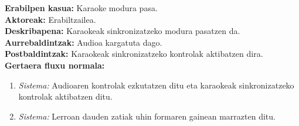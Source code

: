 \textbf{Erabilpen kasua:} Karaoke modura pasa.\\
\textbf{Aktoreak:} Erabiltzailea.\\
\textbf{Deskribapena:} Karaokeak sinkronizatzeko modura pasatzen da.\\
\textbf{Aurrebaldintzak:} Audioa kargatuta dago.\\
\textbf{Postbaldintzak:} Karaokeak sinkronizatzeko kontrolak aktibatzen dira.\\
\textbf{Gertaera fluxu normala:}
\begin{enumerate}
	\item \textit{Sistema:} Audioaren kontrolak ezkutatzen ditu eta karaokeak sinkronizatzeko kontrolak aktibatzen ditu.
	\item \textit{Sistema:} Lerroan dauden zatiak uhin formaren gainean marrazten ditu.
\end{enumerate}
\newpage


